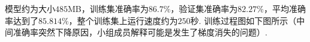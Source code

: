 \documentclass[12pt, a4paper, oneside]{ctexart}
\numberwithin{equation}{section}  %
\begin{document}
模型约为大小$485$MB，训练集准确率为$86.7\%$，验证集准确率为$82.27\%$，平均准确率达到了$85.814\%$，整个训练集上运行速度约为$250$秒. 训练过程图如下图所示（中间准确率突然下降原因，小组成员解释可能是发生了梯度消失的问题）.
\vspace*{-0.5cm}
\begin{figure}[htbp]
  \hspace*{-5.5cm}
  \centering
\end{figure}\vspace*{-1cm}
\end{document}
